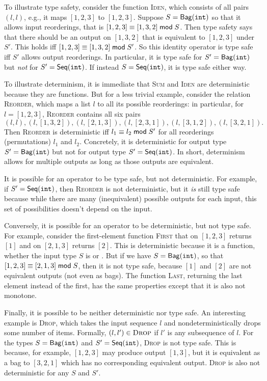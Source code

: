 To illustrate type safety, consider the function \textsc{Iden}, which consists of all pairs $(l, l)$, e.g., it maps $[1, 2, 3]$ to $[1, 2, 3]$.
Suppose $S = \mathsf{Bag}({\texttt{int}}){}$ so that it allows input reorderings, that is $[1, 2, 3] \equiv [1, 3, 2] \;\mathsf{mod}\; {S}$.
Then type safety says that there should be an output on $[1, 3, 2]$ that is equivalent to $[1, 2, 3]$ under $S'$.
This holds iff $[1, 2, 3] \equiv [1, 3, 2] \;\mathsf{mod}\; {S'}$.
So this identity operator is type safe iff $S'$ allows output reorderings.
In particular, it is type safe for $S' = \mathsf{Bag}({\texttt{int}}){}$ but \emph{not} for $S' = \mathsf{Seq}({\texttt{int}}){}$.
If instead $S = \mathsf{Seq}({\texttt{int}}){}$, it is type safe either way.

To illustrate determinism, it is immediate that \textsc{Sum} and \textsc{Iden} are deterministic because they are functions. But for a less trivial example, consider the relation \textsc{Reorder}, which maps a list $l$ to all its possible reorderings: in particular, for $l = [1, 2, 3]$, \textsc{Reorder} contains all six pairs
\[
(l, l), (l, [1, 3, 2]), (l, [2, 1, 3]), (l, [2, 3, 1]), (l, [3, 1, 2]), (l, [3, 2, 1]).
\]
Then \textsc{Reorder} is deterministic iff $l_1 \equiv l_2 \;\mathsf{mod}\; {S'}$ for all reorderings (permutations) $l_1$ and $l_2$.
Concretely, it is deterministic for output type $S' = \mathsf{Bag}({\texttt{int}}){}$ but not for output type $S' = \mathsf{Seq}({\texttt{int}}){}$.
In short, determinism allows for multiple outputs as long as those outputs are equivalent.

It is possible for an operator to be type safe, but not deterministic. For example, if $S' = \mathsf{Seq}({\texttt{int}}){}$, then \textsc{Reorder} is not deterministic, but it \emph{is} still type safe because while there are many (inequivalent) possible outputs for each input, this set of possibilities doesn't depend on the input.

Conversely, it is possible for an operator to be deterministic, but not type safe.
For example, consider the first-element function \textsc{First} that on $[1, 2, 3]$ returns $[1]$ and on $[2, 1, 3]$ returns $[2]$. This is deterministic because it is a function, whether the input type $S$ is \seqint{} or \relint{}. But if we have $S = \mathsf{Bag}({\texttt{int}}){}$, so that $[1, 2, 3] \equiv [2, 1, 3] \;\mathsf{mod}\; {S}$, then it is not type safe, because $[1]$ and $[2]$ are not equivalent outputs (not even as bags).
The function \textsc{Last}, returning the last element instead of the first, has the same properties except that it is also not monotone.

Finally, it is possible to be neither deterministic nor type safe.
An interesting example is \textsc{Drop}, which takes the input sequence $l$ and nondeterministically drops some number of items. Formally, $(l, l') \in \textsc{Drop}$ if $l'$ is any subsequence of $l$. For the types $S = \mathsf{Bag}({\texttt{int}}){}$ and $S' = \mathsf{Seq}({\texttt{int}}){}$, \textsc{Drop} is not type safe.
This is because, for example, $[1, 2, 3]$ may produce output $[1, 3]$, but it is equivalent as a bag to $[3, 2, 1]$ which has no corresponding equivalent output.
\textsc{Drop} is also not deterministic for any $S$ and $S'$.

